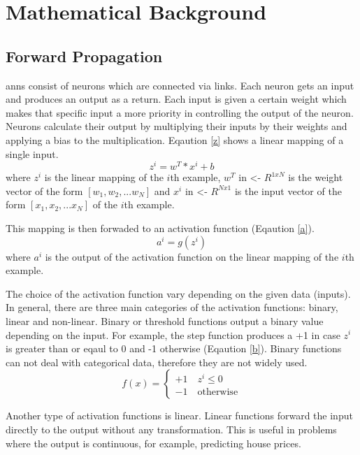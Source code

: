 \documentclass[runningheads]{llncs}
\begin{document}
\section{Mathematical Background}

\subsection{Forward Propagation}
\gls{anns} consist of neurons which are connected via links. Each neuron gets an input and produces an output as a return. 
Each input is given a certain weight which makes that specific input a more priority in controlling the output of the neuron.
Neurons calculate their output by multiplying their inputs by their weights and applying a bias to the multiplication. Eqaution \ref{z}
shows a linear mapping of a single input.
\begin{equation}
\label{z}
    z^i = w^T * x^i + b
\end{equation}
where $z^i$ is the linear mapping of the $i$th example,  $w^T$ in <- $ R^{1xN} $ is the weight vector of the form $[w_1, w_2, ... w_N]$ and
$x^i$ in <- $ R^{Nx1} $ is the input vector  of the form $[x_1, x_2, ... x_N]$ of the $i$th example.

This mapping is then forwaded to an activation function (Eqaution \ref{a}).
\begin{equation}
    \label{a}
        a^i = g(z^i)
\end{equation}
where $a^i$ is the output of the activation function on the linear mapping of the $i$th example.

The choice of the activation function vary depending on the given data (inputs). 
In general, 
there are three main categories of the activation functions: binary, linear and non-linear. 
Binary or threshold functions output a binary value depending on the input. 
For example, the step function produces a +1 in case $z^i$ is greater than or eqaul to 0 and -1 otherwise (Eqaution \ref{b}).
Binary functions can not deal with categorical data, therefore they are not widely used.
\begin{equation}
    \label{b}
f(x) = \left\{ \begin{array}{ll} +1 \quad z^i \leq 0 \\ -1 \quad \text{otherwise} \end{array} \right.
\end{equation}

Another type of activation functions is linear. 
Linear functions forward the input directly to the output without any transformation.
This is useful in problems where the output is continuous, for example, predicting house prices.
\end{document}
